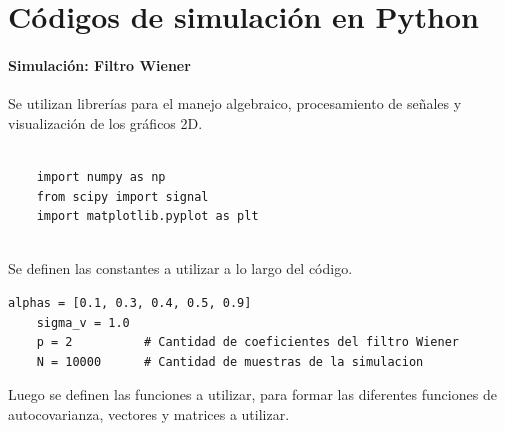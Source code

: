 \documentclass[a4paper]{article}
\begin{document}
\newpage
 \section{Códigos de simulación en Python}
 \label{anexo:codigo_python}

 
 \paragraph{Simulación: Filtro Wiener}
  
 
 
 Se utilizan librerías para el manejo algebraico, procesamiento de señales y visualización de los gráficos 2D.
 \begin{lstlisting}[caption={Librerias utilizadas}, label={lst:wiener_ar1}]
 	
 	import numpy as np
 	from scipy import signal
 	import matplotlib.pyplot as plt
 	
 \end{lstlisting}
 
 
 Se definen las constantes a utilizar a lo largo del código.
 
 \begin{lstlisting}[caption={Definición de constantes.}, label={lst:wiener_ar1_constantes}]
 	alphas = [0.1, 0.3, 0.4, 0.5, 0.9]
 	sigma_v = 1.0
 	p = 2          # Cantidad de coeficientes del filtro Wiener
 	N = 10000      # Cantidad de muestras de la simulacion
 \end{lstlisting}
 
 Luego se definen las funciones a utilizar, para formar las diferentes funciones de autocovarianza, vectores y matrices a utilizar.
 
\end{document}
